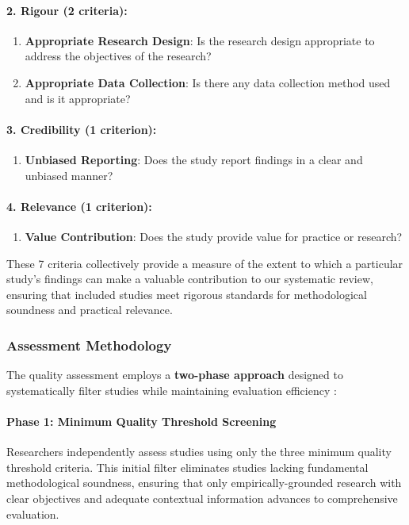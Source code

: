 \documentclass[acmsmall]{acmart}
\begin{document}
\paragraph{2. Rigour (2 criteria):}
\begin{enumerate}[label=\alph*)]
    \item \textbf{Appropriate Research Design}: Is the research design appropriate to address the objectives of the research?
    \item \textbf{Appropriate Data Collection}: Is there any data collection method used and is it appropriate?
\end{enumerate}

\paragraph{3. Credibility (1 criterion):}
\begin{enumerate}[label=\alph*)]
    \item \textbf{Unbiased Reporting}: Does the study report findings in a clear and unbiased manner?
\end{enumerate}

\paragraph{4. Relevance (1 criterion):}
\begin{enumerate}[label=\alph*)]
    \item \textbf{Value Contribution}: Does the study provide value for practice or research?
\end{enumerate}

These 7 criteria collectively provide a measure of the extent to which a particular study's findings can make a valuable contribution to our systematic review, ensuring that included studies meet rigorous standards for methodological soundness and practical relevance.

\subsubsection{Assessment Methodology}\label{subsubsec:phase-3-quality-assessment:assessment-methodology}
The quality assessment employs a \textbf{two-phase approach} designed to systematically filter studies while maintaining evaluation efficiency \citep{ataei2022state}:

\paragraph{Phase 1: Minimum Quality Threshold Screening}
Researchers independently assess studies using only the three minimum quality threshold criteria. This initial filter eliminates studies lacking fundamental methodological soundness, ensuring that only empirically-grounded research with clear objectives and adequate contextual information advances to comprehensive evaluation.
\end{document}
